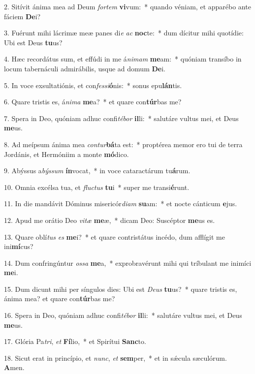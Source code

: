 2. Sitívit ánima mea ad Deum \textit{for}\textit{tem} \textbf{vi}vum:~*  quando véniam, et apparébo ante fáciem \textbf{De}i?\

3. Fuérunt mihi lácrimæ meæ panes di\textit{e} \textit{ac} \textbf{noc}te:~*  dum dícitur mihi quotídie: Ubi est Deus \textbf{tu}us?\

4. Hæc recordátus sum, et effúdi in me á\textit{ni}\textit{mam} \textbf{me}am:~*  quóniam transíbo in locum tabernáculi admirábilis, usque ad domum \textbf{De}i.\

5. In voce exsultatiónis, et con\textit{fes}\textit{si}\textbf{ó}nis:~*  sonus epu\textbf{lán}tis.\

6. Quare tristis es, á\textit{ni}\textit{ma} \textbf{me}a?~*  et quare con\textbf{túr}bas me?\

7. Spera in Deo, quóniam adhuc confi\textit{té}\textit{bor} \textbf{il}li:~*  salutáre vultus mei, et Deus \textbf{me}us.\

8. Ad meípsum ánima mea \textit{con}\textit{tur}\textbf{bá}ta est:~*  proptérea memor ero tui de terra Jordánis, et Hermóniim a monte \textbf{mó}dico.\

9. Abýssus a\textit{býs}\textit{sum} \textbf{ín}vocat,~*  in voce cataractárum tu\textbf{á}rum.\

10. Omnia excélsa tua, et \textit{fluc}\textit{tus} \textbf{tu}i~*  super me transi\textbf{é}runt.\

11. In die mandávit Dóminus misericór\textit{di}\textit{am} \textbf{su}am:~*  et nocte cánticum \textbf{e}jus.\

12. Apud me orátio Deo \textit{vi}\textit{tæ} \textbf{me}æ,~*  dicam Deo: Suscéptor \textbf{me}us es.\

13. Quare oblí\textit{tus} \textit{es} \textbf{me}i?~*  et quare contristátus incédo, dum afflígit me ini\textbf{mí}cus?\

14. Dum confringúntur \textit{os}\textit{sa} \textbf{me}a,~*  exprobravérunt mihi qui tríbulant me inimíci \textbf{me}i.\

15. Dum dicunt mihi per síngulos dies: Ubi est \textit{De}\textit{us} \textbf{tu}us?~*  quare tristis es, ánima mea? et quare con\textbf{túr}bas me?\

16. Spera in Deo, quóniam adhuc confi\textit{té}\textit{bor} \textbf{il}li:~*  salutáre vultus mei, et Deus \textbf{me}us.\

17. Glória Pa\textit{tri}, \textit{et} \textbf{Fí}lio,~*  et Spirítui \textbf{Sanc}to.\

18. Sicut erat in princípio, et \textit{nunc}, \textit{et} \textbf{sem}per,~*  et in sǽcula sæculórum. \textbf{A}men.\

